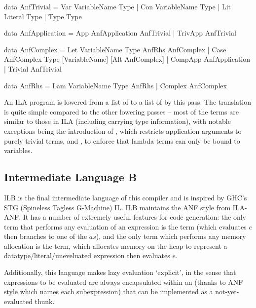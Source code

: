 \documentclass[dissertation.tex]{subfiles}
\begin{document}
{{        \begin{haskellfigure}
        data AnfTrivial = Var VariableName Type
                        | Con VariableName Type
                        | Lit Literal Type
                        | Type Type

        data AnfApplication = App AnfApplication AnfTrivial
                            | TrivApp AnfTrivial

        data AnfComplex = Let VariableName Type AnfRhs AnfComplex
                        | Case AnfComplex Type [VariableName] [Alt AnfComplex]
                        | CompApp AnfApplication
                        | Trivial AnfTrivial

        data AnfRhs = Lam VariableName Type AnfRhs
                    | Complex AnfComplex
        \end{haskellfigure}

        An ILA program is lowered from a list of  to a list of  by
        this pass. The translation is quite simple compared to the other lowering passes -- most of the terms are
        similar to those in ILA (including carrying type information), with notable exceptions being the
        introduction of , which restricts application arguments to purely trivial terms, and
        , to enforce that lambda terms can only be bound to variables.

    }
    \subsection{Intermediate Language B}
    {

        ILB is the final intermediate language of this compiler and is inspired by GHC's STG (Spineless Tagless
        G-Machine) IL. ILB maintains the ANF style from ILA-ANF. It has a number of extremely useful features for
        code generation: the only term that performs any evaluation of an expression is the  term (which evaluates \(e\) then branches to one of the \(as\)), and the only term which
        performs any memory allocation is the \haskell{ExpLit #\(v\ r\ e\)#} term, which allocates memory on the
        heap to represent a datatype/literal/uneveluated expression then evaluates \(e\).

        Additionally, this language makes lazy evaluation `explicit', in the sense that expressions to be evaluated
        are always encapsulated within an \haskell{RhsClosure} (thanks to ANF style which names each subexpression)
        that can be implemented as a not-yet-evaluated thunk.

}}
\end{document}
